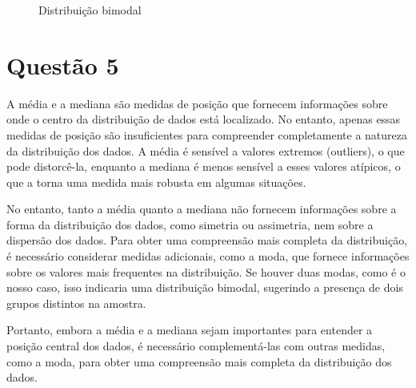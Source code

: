 \documentclass{article}
\begin{document}
\begin{figure}[h]
    \centering
    \caption{Distribuição bimodal}
    \label{fig:bimodal_continuous_distribution_same_height}
\end{figure}
    
    
\section*{Questão 5}

A média e a mediana são medidas de posição que fornecem informações sobre onde o centro da distribuição de dados está localizado. No entanto, apenas essas medidas de posição são insuficientes para compreender completamente a natureza da distribuição dos dados. A média é sensível a valores extremos (outliers), o que pode distorcê-la, enquanto a mediana é menos sensível a esses valores atípicos, o que a torna uma medida mais robusta em algumas situações.

No entanto, tanto a média quanto a mediana não fornecem informações sobre a forma da distribuição dos dados, como simetria ou assimetria, nem sobre a dispersão dos dados. Para obter uma compreensão mais completa da distribuição, é necessário considerar medidas adicionais, como a moda, que fornece informações sobre os valores mais frequentes na distribuição. Se houver duas modas, como é o nosso caso, isso indicaria uma distribuição bimodal, sugerindo a presença de dois grupos distintos na amostra.

Portanto, embora a média e a mediana sejam importantes para entender a posição central dos dados, é necessário complementá-las com outras medidas, como a moda, para obter uma compreensão mais completa da distribuição dos dados.
\end{document}
